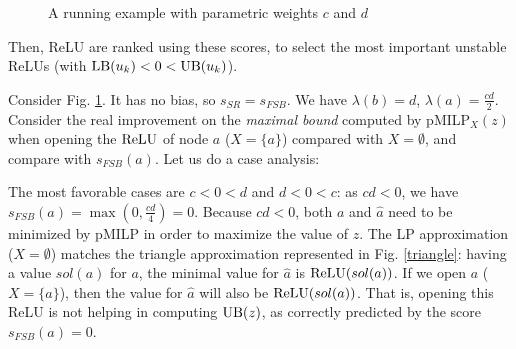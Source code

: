\begin{figure}[b!]
	\vspace{-0.8cm}
	\caption{A running example with parametric weights {\color{red}$c$} and {\color{red}$d$}}
	\label{img:FSB_example}
\end{figure}





	
	Then, ReLU are ranked using these scores, to select the most important unstable ReLUs
	(with $\mathrm{LB}(u_k) < 0 < \mathrm{UB}(u_k)$).
	


 Consider Fig. \ref{img:FSB_example}. 
It has no bias, so $s_{SR}=s_{FSB}$.
We have $\lambda(b)=d$, $\lambda(a)=\frac{cd}{2}$.
Consider the real improvement on the {\em maximal bound} computed by pMILP$_X(z)$ when opening the $\mathrm{ReLU}$ of node $a$ ($X=\{a\}$) compared with $X=\emptyset$, and compare with 
$s_{FSB}(a)$. Let us do a case analysis:



The most favorable cases are $c < 0 < d$ and $d < 0 < c$: 
as $cd <0$, we have $s_{FSB}(a)=\max(0,\frac{cd}{4}) = 0$.
Because $cd <0$, both $a$ and $\hat{a}$ need to be minimized by pMILP in order to maximize the value of $z$. The LP approximation ($X=\emptyset$) matches the triangle approximation represented in Fig. \ref{triangle}: having a value $sol(a)$ for $a$, the minimal value for $\hat{a}$ is $\mathrm{ReLU}(sol(a))$. If we open $a$ ($X=\{a\}$), then the value for $\hat{a}$ will also be $\mathrm{ReLU}(sol(a))$. That is, opening this ReLU is not helping in computing $\mathrm{UB}(z)$, as correctly predicted by the score $s_{FSB}(a)= 0$.







